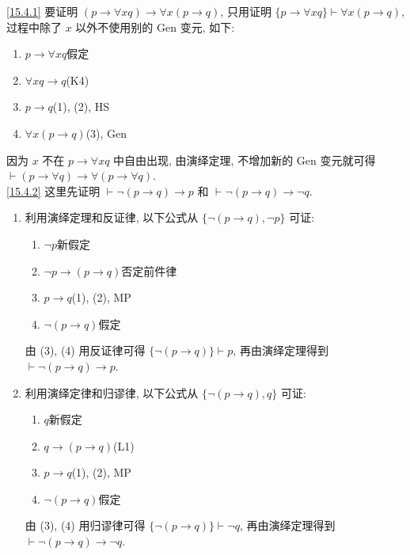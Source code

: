 \documentclass[boxes]{homework}
\begin{document}
\begin{solution}
    \ref{15.4.1} 要证明 $(p\to \forall xq)\to \forall x(p\to q)$, 只用证明 $\{p\to \forall xq\}\vdash \forall x(p\to q)$, 过程中除了 $x$ 以外不使用别的 Gen 变元, 如下:
    \begin{enumerate}[label = (\arabic*), itemsep = 0em, topsep = .5em, partopsep = .5em]
        \item $p\to \forall xq$\hfill 假定
        \item $\forall xq\to q$\hfill (K4)
        \item $p\to q$\hfill (1), (2), HS
        \item $\forall x(p\to q)$\hfill (3), Gen
    \end{enumerate}
    因为 $x$ 不在 $p\to \forall xq$ 中自由出现, 由演绎定理, 不增加新的 Gen 变元就可得 $\vdash (p\to \forall q)\to \forall (p\to \forall q)$.
    \\
    \ref{15.4.2} 这里先证明 $\vdash \lnot (p\to q)\to p$ 和 $\vdash \lnot (p\to q)\to \lnot q$.
    \begin{enumerate}[parsep = 0pt, itemsep = .25em, topsep = .25em]
        \item 利用演绎定理和反证律, 以下公式从 $\{\lnot (p\to q), \lnot p\}$ 可证:
              \begin{enumerate}[label = (\arabic*), itemsep = 0em, topsep = .5em, partopsep = .5em]
                  \item $\lnot p$\hfill 新假定
                  \item $\lnot p\to (p\to q)$\hfill 否定前件律
                  \item $p\to q$\hfill (1), (2), MP
                  \item $\lnot (p\to q)$\hfill 假定
              \end{enumerate}
              由 (3), (4) 用反证律可得 $\{\lnot(p\to q)\}\vdash p$, 再由演绎定理得到 $\vdash \lnot (p\to q)\to p$.
        \item 利用演绎定律和归谬律, 以下公式从 $\{\lnot(p\to q), q\}$ 可证:
              \begin{enumerate}[label = (\arabic*), itemsep = 0em, topsep = .5em, partopsep = .5em]
                  \item $q$\hfill 新假定
                  \item $q\to (p\to q)$\hfill (L1)
                  \item $p\to q$\hfill (1), (2), MP
                  \item $\lnot (p\to q)$\hfill 假定
              \end{enumerate}
              由 (3), (4) 用归谬律可得 $\{\lnot(p\to q)\}\vdash \lnot q$, 再由演绎定理得到 $\vdash \lnot (p\to q)\to \lnot q$.
    \end{enumerate}


\end{solution}
\end{document}
